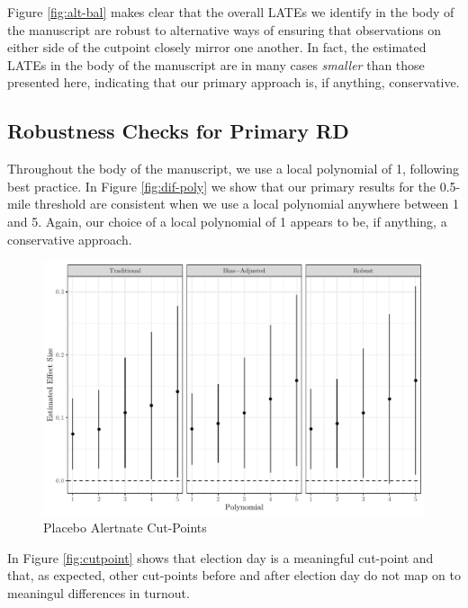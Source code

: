 \documentclass[
  12pt,
]{article}
\begin{document}
Figure \ref{fig:alt-bal} makes clear that the overall LATEs we identify in the body of the manuscript are robust to alternative ways of ensuring that observations on either side of the cutpoint closely mirror one another. In fact, the estimated LATEs in the body of the manuscript are in many cases \emph{smaller} than those presented here, indicating that our primary approach is, if anything, conservative.

\hypertarget{robustness-checks-for-primary-rd}{%
\subsection*{Robustness Checks for Primary RD}\label{robustness-checks-for-primary-rd}}

Throughout the body of the manuscript, we use a local polynomial of 1, following best practice. In Figure \ref{fig:dif-poly} we show that our primary results for the 0.5-mile threshold are consistent when we use a local polynomial anywhere between 1 and 5. Again, our choice of a local polynomial of 1 appears to be, if anything, a conservative approach.

\begin{figure}[!ht]

{\centering \includegraphics{si_files/figure-latex/diff-poly-1} 

}

\caption{\label{fig:dif-poly}Placebo Alertnate Cut-Points}\label{fig:diff-poly}
\end{figure}

In Figure \ref{fig:cutpoint} shows that election day is a meaningful cut-point and that, as expected, other cut-points before and after election day do not map on to meaningul differences in turnout.
\end{document}
